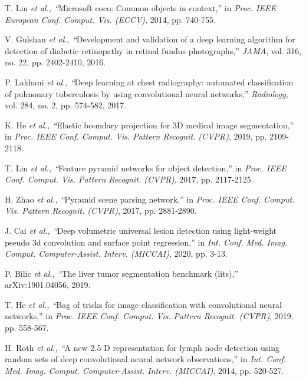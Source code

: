 \documentclass[journal,twoside,web]{ieeecolor}
\begin{document}
\begin{thebibliography}{00}
 T. Lin \emph{et al., ``}Microsoft coco: Common objects in context,'' in \emph{Proc. IEEE European Conf. Comput. Vis. (ECCV)}, 2014, pp. 740-755.

 V. Gulshan \emph{et al., ``}Development and validation of a deep learning algorithm for detection of diabetic retinopathy in retinal fundus photographs,'' \emph{JAMA}, vol. 316, no. 22,  pp. 2402-2410, 2016. 

 P. Lakhani \emph{et al., ``}Deep learning at chest radiography: automated classification of pulmonary tuberculosis by using convolutional neural networks,'' \emph{Radiology}, vol. 284, no. 2,  pp. 574-582, 2017. 



 K. He \emph{et al., ``}Elastic boundary projection for 3D medical image segmentation,'' in \emph{Proc. IEEE Conf. Comput. Vis. Pattern Recognit. (CVPR)}, 2019, pp. 2109-2118.







 T. Lin \emph{et al., ``}Feature pyramid networks for object detection,'' in \emph{Proc. IEEE Conf. Comput. Vis. Pattern Recognit. (CVPR)}, 2017, pp. 2117-2125.

 H. Zhao \emph{et al., ``}Pyramid scene parsing network,'' in \emph{Proc. IEEE Conf. Comput. Vis. Pattern Recognit. (CVPR)}, 2017, pp. 2881-2890.

 J. Cai \emph{et al., ``}Deep volumetric universal lesion detection using light-weight pseudo 3d convolution and surface point regression,'' in \emph{Int. Conf. Med. Imag. Comput. Computer-Assist. Interv. (MICCAI)}, 2020, pp. 3-13.



 P. Bilic \emph{et al., ``}The liver tumor segmentation benchmark (lits),'' arXiv:1901.04056, 2019.



 T. He \emph{et al., ``}Bag of tricks for image classification with convolutional neural networks,'' in \emph{Proc. IEEE Conf. Comput. Vis. Pattern Recognit. (CVPR)}, 2019, pp. 558-567.

 H. Roth \emph{et al., ``}A new 2.5 D representation for lymph node detection using random sets of deep convolutional neural network observations,'' in \emph{Int. Conf. Med. Imag. Comput. Computer-Assist. Interv. (MICCAI)}, 2014, pp. 520-527.




\end{thebibliography}
\end{document}
